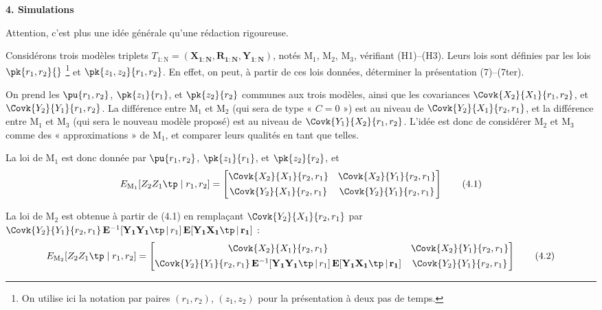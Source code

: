 \documentclass[12pt, a4paper]{article}
\newcommand{\EMj}[2]{E_{\mathrm{M}_{#1}}\!\left[#2\right]}
\begin{document}
\bigskip
{\color{red}
\noindent\textbf{4. Simulations}

\medskip
Attention, c'est plus une idée générale qu'une rédaction rigoureuse.

Considérons trois modèles triplets $T_{1:\mathrm{N}} = (\mathbf{X_{1:N}}, \mathbf{R_{1:N}},
\mathbf{Y_{1:N}})$, notés $\mathrm{M}_1$, $\mathrm{M}_2$, $\mathrm{M}_3$, vérifiant
(H1)--(H3). Leurs lois sont définies par les lois $\pk{r_1, r_2}{}$%
\footnote{On utilise ici la notation par paires $(r_1,r_2)$, $(z_1,z_2)$ pour la présentation
  à deux pas de temps.}
et $\pk{z_1, z_2}{r_1, r_2}$. En effet, on peut, à partir de ces lois données, déterminer la
présentation (7)--(7ter).

On prend les $\pu{r_1, r_2}$, $\pk{z_1}{r_1}$, et $\pk{z_2}{r_2}$ communes aux trois modèles,
ainsi que les covariances $\Covk{X_2}{X_1}{r_1, r_2}$, et $\Covk{Y_2}{Y_1}{r_1, r_2}$.
La différence entre $\mathrm{M}_1$ et $\mathrm{M}_2$ (qui sera de type « $C=0$ ») est au
niveau de $\Covk{Y_2}{X_1}{r_2, r_1}$, et la différence entre $\mathrm{M}_1$ et $\mathrm{M}_3$
(qui sera le nouveau modèle proposé) est au niveau de $\Covk{Y_1}{X_2}{r_1, r_2}$.
L'idée est donc de considérer $\mathrm{M}_2$ et $\mathrm{M}_3$ comme des
« approximations » de $\mathrm{M}_1$, et comparer leurs qualités en tant que telles.

La loi de $\mathrm{M}_1$ est donc donnée par $\pu{r_1, r_2}$, $\pk{z_1}{r_1}$, et
$\pk{z_2}{r_2}$, et
\begin{equation}
  \EMj{1}{Z_2 Z_1\tp \mid r_1, r_2}
  = \begin{bmatrix}
      \Covk{X_2}{X_1}{r_2, r_1} & \Covk{X_2}{Y_1}{r_2, r_1} \\[4pt]
      \Covk{Y_2}{X_1}{r_2, r_1} & \Covk{Y_2}{Y_1}{r_2, r_1}
    \end{bmatrix}
  \tag{4.1}
\end{equation}

La loi de $\mathrm{M}_2$ est obtenue à partir de (4.1) en remplaçant
$\Covk{Y_2}{X_1}{r_2, r_1}$ par
$\Covk{Y_2}{Y_1}{r_2, r_1}\,\mathbf{E}^{-1}[\mathbf{Y_1 Y_1\tp}\,|\,r_1]\,\mathbf{E}[\mathbf{Y_1 X_1\tp}\,|\,\mathbf{r_1}]$ :
\begin{equation}
  \EMj{2}{Z_2 Z_1\tp \mid r_1, r_2}
  = \begin{bmatrix}
      \Covk{X_2}{X_1}{r_2, r_1} & \Covk{X_2}{Y_1}{r_2, r_1} \\[4pt]
      \Covk{Y_2}{Y_1}{r_2, r_1}\,\mathbf{E}^{-1}[\mathbf{Y_1 Y_1\tp}\,|\,r_1]\,\mathbf{E}[\mathbf{Y_1 X_1\tp}\,|\,\mathbf{r_1}]
        & \Covk{Y_2}{Y_1}{r_2, r_1}
    \end{bmatrix}
  \tag{4.2}
\end{equation}

}
\end{document}
